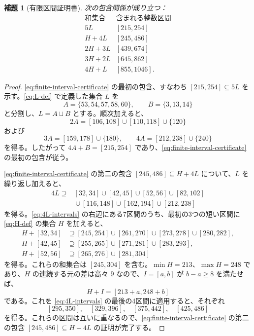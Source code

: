 \documentclass[12pt]{ltjsarticle}
\theoremstyle{plain}
\newtheorem{lemma}[theorem]{補題}
\theoremstyle{definition}
\theoremstyle{plain}
\begin{document}
\begin{lemma}[有限区間証明書]\label{lem:finitefive}
次の包含関係が成り立つ：
\begin{equation}\label{eq:finite-interval-certificate}
\begin{array}{c|c}
\text{和集合}&\text{含まれる整数区間}\\ \hline
5L &[215,254]\\
H+4L &[245,486]\\
2H+3L &[439,674]\\
3H+2L &[645,862]\\
4H+L &[855,1046].
\end{array}
\end{equation}
\end{lemma}

\begin{proof}
\eqref{eq:finite-interval-certificate} の最初の包含、すなわち $[215,254]\subseteq5L$ を示す。\eqref{eq:L-def} で定義した集合 $L$ を
\[
 A=\{53,54,57,58,60\},\qquad B=\{3,13,14\}
\]
と分割し、$L=A\sqcup B$ とする。順次加えると、
\[
 2A=[106,108]\cup[110,118]\cup\{120\}
\]
および
\[
 3A=[159,178]\cup\{180\},\qquad
 4A=[212,238]\cup\{240\}
\]
を得る。したがって $4A+B=[215,254]$ であり、\eqref{eq:finite-interval-certificate} の最初の包含が従う。

\eqref{eq:finite-interval-certificate} の第二の包含 $[245,486]\subseteq H+4L$ について、$L$ を繰り返し加えると、
\begin{equation}\label{eq:4L-intervals}
\begin{split}
4L\supseteq{}&[32,34]\cup[42,45]\cup[52,56]\cup[82,102]\\
 &{}\cup[116,148]\cup[162,194]\cup[212,238]
\end{split}
\end{equation}
を得る。\eqref{eq:4L-intervals} の右辺にある7区間のうち、最初の3つの短い区間に \eqref{eq:H-def} の集合 $H$ を加えると、
\[
\begin{aligned}
H+[32,34]&\supseteq[245,254]\cup[261,270]
 \cup[273,278]\cup[280,282],\\
H+[42,45]&\supseteq[255,265]\cup[271,281]\cup[283,293],\\
H+[52,56]&\supseteq[265,276]\cup[281,304]
\end{aligned}
\]
を得る。これらの和集合は $[245,304]$ を含む。$\min H=213$、$\max H=248$ であり、$H$ の連続する元の差は高々 $9$ なので、$I=[a,b]$ が $b-a\geq8$ を満たせば、
\[
 H+I=[213+a,248+b]
\]
である。これを \eqref{eq:4L-intervals} の最後の4区間に適用すると、それぞれ
\[
 [295,350],\quad[329,396],\quad[375,442],\quad[425,486]
\]
を得る。これらの区間は互いに重なるので、\eqref{eq:finite-interval-certificate} の第二の包含 $[245,486]\subseteq H+4L$ の証明が完了する。


\end{proof}
\end{document}
